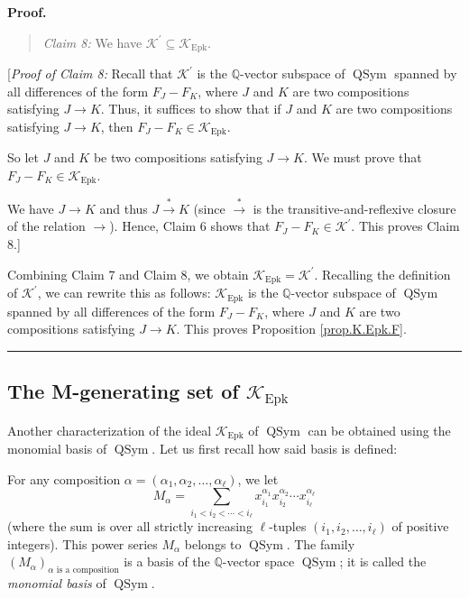 \documentclass[numbers=enddot,12pt,final,onecolumn,notitlepage]{scrartcl}%
\theoremstyle{definition}
\newenvironment{statement}{\begin{quote}}{\end{quote}}
\newenvironment{proof}[1][Proof]{\noindent\textbf{#1.} }{\ \rule{0.5em}{0.5em}}
\let\sumnonlimits\sum
\renewcommand{\sum}{\sumnonlimits\limits}
\begin{document}
\begin{proof}
\begin{statement}
\textit{Claim 8:} We have $\mathcal{K}^{\prime}\subseteq\mathcal{K}%
_{\operatorname*{Epk}}$.
\end{statement}

[\textit{Proof of Claim 8:} Recall that $\mathcal{K}^{\prime}$ is the
$\mathbb{Q}$-vector subspace of $\operatorname*{QSym}$ spanned by all
differences of the form $F_{J}-F_{K}$, where $J$ and $K$ are two compositions
satisfying $J\rightarrow K$. Thus, it suffices to show that if $J$ and $K$ are
two compositions satisfying $J\rightarrow K$, then $F_{J}-F_{K}\in
\mathcal{K}_{\operatorname*{Epk}}$.

So let $J$ and $K$ be two compositions satisfying $J\rightarrow K$. We must
prove that $F_{J}-F_{K}\in\mathcal{K}_{\operatorname*{Epk}}$.

We have $J\rightarrow K$ and thus $J\overset{\ast}{\rightarrow}K$ (since
$\overset{\ast}{\rightarrow}$ is the transitive-and-reflexive closure of the
relation $\rightarrow$). Hence, Claim 6 shows that $F_{J}-F_{K}\in
\mathcal{K}^{\prime}$. This proves Claim 8.]

Combining Claim 7 and Claim 8, we obtain $\mathcal{K}_{\operatorname*{Epk}%
}=\mathcal{K}^{\prime}$. Recalling the definition of $\mathcal{K}^{\prime}$,
we can rewrite this as follows: $\mathcal{K}_{\operatorname*{Epk}}$ is the
$\mathbb{Q}$-vector subspace of $\operatorname*{QSym}$ spanned by all
differences of the form $F_{J}-F_{K}$, where $J$ and $K$ are two compositions
satisfying $J\rightarrow K$. This proves Proposition \ref{prop.K.Epk.F}.
\end{proof}

\subsection{The M-generating set of $\mathcal{K}_{\operatorname*{Epk}}$}

Another characterization of the ideal $\mathcal{K}_{\operatorname*{Epk}}$ of
$\operatorname*{QSym}$ can be obtained using the monomial basis of
$\operatorname*{QSym}$. Let us first recall how said basis is defined:

For any composition $\alpha=\left(  \alpha_{1},\alpha_{2},\ldots,\alpha_{\ell
}\right)  $, we let%
\[
M_{\alpha}=\sum_{i_{1}<i_{2}<\cdots<i_{\ell}}x_{i_{1}}^{\alpha_{1}}x_{i_{2}%
}^{\alpha_{2}}\cdots x_{i_{\ell}}^{\alpha_{\ell}}%
\]
(where the sum is over all strictly increasing $\ell$-tuples $\left(
i_{1},i_{2},\ldots,i_{\ell}\right)  $ of positive integers). This power series
$M_{\alpha}$ belongs to $\operatorname*{QSym}$. The family $\left(  M_{\alpha
}\right)  _{\alpha\text{ is a composition}}$ is a basis of the $\mathbb{Q}%
$-vector space $\operatorname*{QSym}$; it is called the \textit{monomial
basis} of $\operatorname*{QSym}$.
\end{document}

